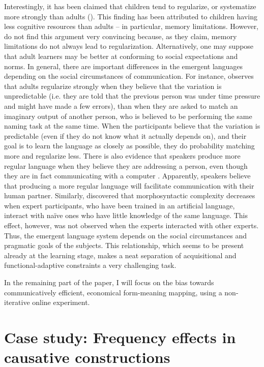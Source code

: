 \documentclass[output=paper]{langsci/langscibook}
\begin{document}
Interestingly, it has been claimed that children tend to regularize, or systematize more strongly than adults (\citealt{HudsonKamNewport2009}). This finding has been attributed to children having less cognitive resources than adults – in particular, memory limitations. However, \citet{SmithEtAl2017} do not find this argument very convincing because, as they claim, memory limitations do not always lead to regularization. Alternatively, one may suppose that adult learners may be better at conforming to social expectations and norms. In general, there are important differences in the emergent languages depending on the social circumstances of communication. For instance, \citet{Perfors2016} observes that adults regularize strongly when they believe that the variation is unpredictable (i.e. they are told that the previous person was under time pressure and might have made a few errors), than when they are asked to match an imaginary output of another person, who is believed to be performing the same naming task at the same time. When the participants believe that the variation is predictable (even if they do not know what it actually depends on), and their goal is to learn the language as closely as possible, they do probability matching more and regularize less. There is also evidence that speakers produce more regular language when they believe they are addressing a person, even though they are in fact communicating with a computer \citep{FehérEtAl2016}. Apparently, speakers believe that producing a more regular language will facilitate communication with their human partner. Similarly, \citet{Little2011} discovered that morphosyntactic complexity decreases when expert participants, who have been trained in an artificial language, interact with naïve ones who have little knowledge of the same language. This effect, however, was not observed when the experts interacted with other experts. Thus, the emergent language system depends on the social circumstances and pragmatic goals of the subjects. This relationship, which seems to be present already at the learning stage, makes a neat separation of acquisitional and functional-adaptive constraints a very challenging task.  

In the remaining part of the paper, I will focus on the bias towards communicatively efficient, economical form-meaning mapping, using a non-iterative online experiment.

\section{Case study: Frequency effects in causative constructions}\label{sec:levshina:3}
\end{document}
